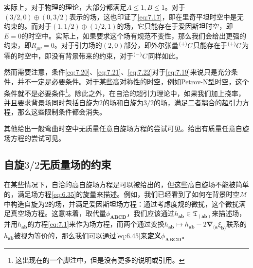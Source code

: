 实际上，对于物理的理论，大部分都满足$A\leq 1,B\leq 1$。对于$( 3/2,0) \oplus ( 0,3/2)$表示的场，这也印证了\ref{eq:7.17}，即在里奇平坦时空中是无约束的。而对于$( 1,1/2) \oplus ( 1/2,1)$的场，它只能存在于爱因斯坦时空，即$E=0$的时空中。实际上，如果要求这个场有规范不变性，那么我们会给出更强的约束，即$R_{\mu \nu } =0$。对于引力场的$( 2,0)$部分，即外尔张量$\prescript{( +)}{}{} C$只能存在于$\prescript{( +)}{}{} C$为零的时空中，即没有背景带来的约束，对于$\prescript{( -)}{}{} C$同样如此。



然而需要注意，条件\ref{eq:7.20}、\ref{eq:7.21}、\ref{eq:7.22}对于\ref{eq:7.19}来说只是充分条件，并不一定是必要条件。对于某些高对称性的时空，例如Petrov-N型时空，这个条件就不是必要条件\footnote{这出现在\parencite{christensen_new_1979}的一个脚注中，但是没有更多的说明或引用。}。除此之外，在自洽的超引力理论中，如果我们加上挠率，并且要求背景场同时包括自旋为$2$的场和自旋为$3/2$的场，满足二者耦合的超引力方程，那么这些限制条件都会消失\parencite{christensen_new_1979,barth_arbitrary_1983,deser_consistent_1976,freedman_progress_1976,giiven_black_nodate}。

其他给出一般弯曲时空中无质量任意自旋场方程的尝试可见\parencite{noauthor_relativistic_1936,dowker_particles_1966,noauthor_relativistic_1939,illge_massless_1992,fang_massless_1978,bengtsson_massless_1986,christensen_new_1979,robinson_differential_1995,barth_arbitrary_1983,frauendiener_class_1999}。给出有质量任意自旋场方程的尝试可见\parencite{illge_massive_1993}。

\subsection{自旋$3/2$无质量场的约束}

在某些情况下，自洽的高自旋场方程是可以被给出的，但这些高自旋场不能被简单的，满足场方程\ref{eq:6.35}的旋量来描述。例如，我们已经看到了如何在背景时空$\mathcal{M}$中构造自旋为$2$的场，并满足爱因斯坦场方程：通过考虑度规的微扰，这个微扰满足真空场方程。这意味着，取代量$\phi _{\boldsymbol{ABCD}}$，我们应该通过$h_{\boldsymbol{ab}} \in \mathfrak{T}_{(\boldsymbol{ab} )}$来描述场，并用$h_{\boldsymbol{ab}}$的方程\ref{eq:7.1}来作为场方程，而两个通过变换$h_{\boldsymbol{ab}} \mapsto h_{\boldsymbol{ab}} -2\mathbf{\nabla }_{(\boldsymbol{a}} \xi _{\boldsymbol{b} )}$联系的$h_{\boldsymbol{ab}}$被视为等价的，那么我们可以通过\ref{eq:6.45}来\textbf{定义}$\phi _{\boldsymbol{ABCD}}$。




